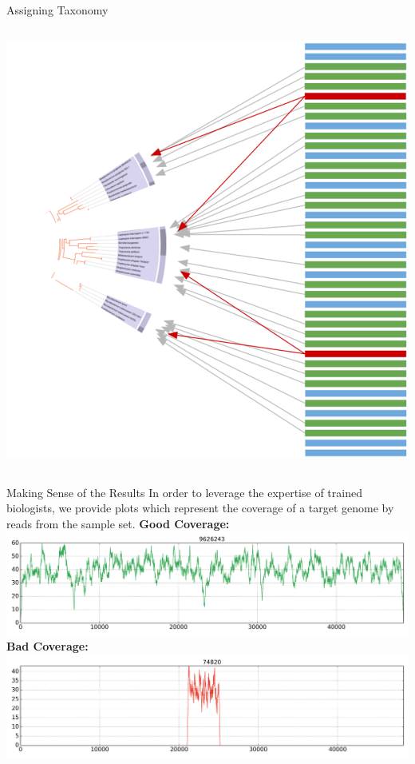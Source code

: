 \documentclass[final,t]{beamer}
\begin{document}
\begin{frame}{}
\begin{columns}[t]
\begin{column}{.3\linewidth}
\begin{block}{Assigning Taxonomy}
\begin{columns}
\begin{column}{.55\linewidth}
\begin{minipage}{\linewidth}
                        \includegraphics[width=.99\linewidth, right]{assets/Subset}
                    \end{minipage}
                \end{column}
            \end{columns}
        \end{block}
        \begin{block}{Making Sense of the Results}
            In order to leverage the expertise of trained biologists, we provide plots which represent the coverage
            of a target genome by reads from the sample set.\newline\newline
        \textbf{Good Coverage:}\\
        \includegraphics[width=.95\linewidth, center]{assets/coverage_plot_good}\\
        \textbf{Bad Coverage:}\\
        \includegraphics[width=.95\linewidth, center]{assets/coverage_plot_bad}
        \end{block}


\end{column}
\end{columns}
\end{frame}
\end{document}
